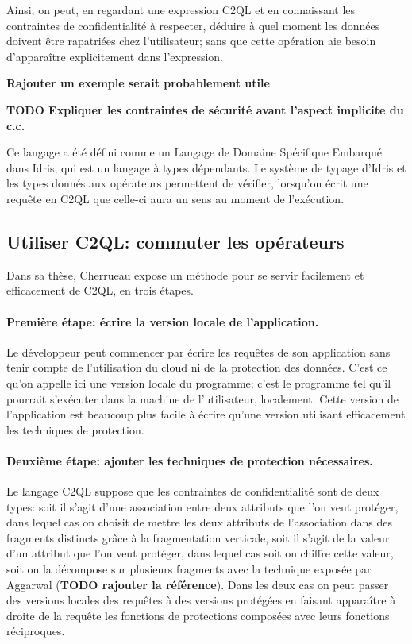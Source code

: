 Ainsi, on peut, en regardant une expression C2QL et en connaissant les
contraintes de confidentialité à respecter,
déduire à quel moment les données doivent être rapatriées chez l'utilisateur;
sans que cette opération aie besoin d'apparaître explicitement dans l'expression.

\textbf{Rajouter un exemple serait probablement utile}

\textbf{TODO Expliquer les contraintes de sécurité avant l'aspect implicite
	du c.c.}

Ce langage a été défini comme un Langage de Domaine Spécifique Embarqué dans
Idris, qui est un langage à types dépendants.
Le système de typage d'Idris et les types donnés aux opérateurs permettent
de vérifier, lorsqu'on écrit une requête en C2QL que celle-ci aura un sens
au moment de l'exécution.

\subsection{Utiliser C2QL: commuter les opérateurs}
Dans sa thèse, Cherrueau expose un méthode pour se servir facilement
et efficacement de C2QL, en trois étapes.

\paragraph{Première étape: écrire la version locale de l'application.}
Le développeur peut commencer par écrire les requêtes de son application
sans tenir compte de l'utilisation du cloud ni de la protection
des données. C'est ce qu'on appelle ici une version \og locale \fg{}
du programme; c'est le programme tel qu'il pourrait s'exécuter dans la machine de l'utilisateur, localement.
Cette version de l'application est beaucoup plus facile à écrire 
qu'une version utilisant efficacement les techniques de protection.

\paragraph{Deuxième étape: ajouter les techniques de protection nécessaires.}
Le langage C2QL suppose que les contraintes de confidentialité sont de deux types:
soit il s'agit d'une association entre deux attributs que l'on veut 
protéger, dans lequel cas on choisit de mettre les deux attributs de l'association
dans des fragments distincts grâce à la fragmentation verticale, soit il s'agit de la
valeur d'un attribut que l'on veut protéger, dans lequel cas soit on chiffre cette valeur,
soit on la décompose sur plusieurs fragments avec la technique exposée par Aggarwal 
(\textbf{TODO rajouter la référence}). Dans les deux cas on peut passer des 
versions locales des requêtes à des versions protégées en faisant apparaître 
à droite de la requête les fonctions de protections composées avec leurs fonctions réciproques.


